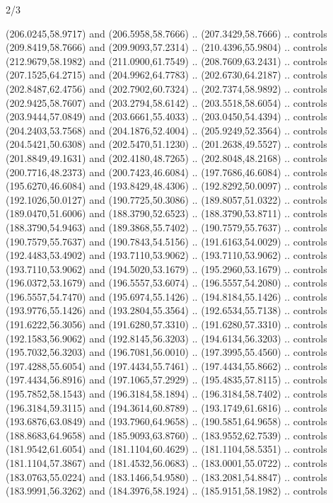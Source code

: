 \begin{flagdescription}{2/3}
\begin{scope}[xshift=0.5\flaglength,yshift=0.5\flagwidth,scale=\flagwidth/180]
\begin{scope}[y=0.8pt, x=0.8pt, yscale=-1,shift={(-168.75,-108.75)}]
  (206.0245,58.9717) and (206.5958,58.7666) .. (207.3429,58.7666) .. controls
  (209.8419,58.7666) and (209.9093,57.2314) .. (210.4396,55.9804) .. controls
  (212.9679,58.1982) and (211.0900,61.7549) .. (208.7609,63.2431) .. controls
  (207.1525,64.2715) and (204.9962,64.7783) .. (202.6730,64.2187) .. controls
  (202.8487,62.4756) and (202.7902,60.7324) .. (202.7374,58.9892) .. controls
  (202.9425,58.7607) and (203.2794,58.6142) .. (203.5518,58.6054) .. controls
  (203.9444,57.0849) and (203.6661,55.4033) .. (203.0450,54.4394) .. controls
  (204.2403,53.7568) and (204.1876,52.4004) .. (205.9249,52.3564) .. controls
  (204.5421,50.6308) and (202.5470,51.1230) .. (201.2638,49.5527) .. controls
  (201.8849,49.1631) and (202.4180,48.7265) .. (202.8048,48.2168) .. controls
  (200.7716,48.2373) and (200.7423,46.6084) .. (197.7686,46.6084) .. controls
  (195.6270,46.6084) and (193.8429,48.4306) .. (192.8292,50.0097) .. controls
  (192.1026,50.0127) and (190.7725,50.3086) .. (189.8057,51.0322) .. controls
  (189.0470,51.6006) and (188.3790,52.6523) .. (188.3790,53.8711) .. controls
  (188.3790,54.9463) and (189.3868,55.7402) .. (190.7579,55.7637) .. controls
  (190.7579,55.7637) and (190.7843,54.5156) .. (191.6163,54.0029) .. controls
  (192.4483,53.4902) and (193.7110,53.9062) .. (193.7110,53.9062) .. controls
  (193.7110,53.9062) and (194.5020,53.1679) .. (195.2960,53.1679) .. controls
  (196.0372,53.1679) and (196.5557,53.6074) .. (196.5557,54.2080) .. controls
  (196.5557,54.7470) and (195.6974,55.1426) .. (194.8184,55.1426) .. controls
  (193.9776,55.1426) and (193.2804,55.3564) .. (192.6534,55.7138) .. controls
  (191.6222,56.3056) and (191.6280,57.3310) .. (191.6280,57.3310) .. controls
  (192.1583,56.9062) and (192.8145,56.3203) .. (194.6134,56.3203) .. controls
  (195.7032,56.3203) and (196.7081,56.0010) .. (197.3995,55.4560) .. controls
  (197.4288,55.6054) and (197.4434,55.7461) .. (197.4434,55.8662) .. controls
  (197.4434,56.8916) and (197.1065,57.2929) .. (195.4835,57.8115) .. controls
  (195.7852,58.1543) and (196.3184,58.1894) .. (196.3184,58.7402) .. controls
  (196.3184,59.3115) and (194.3614,60.8789) .. (193.1749,61.6816) .. controls
  (193.6876,63.0849) and (193.7960,64.9658) .. (190.5851,64.9658) .. controls
  (188.8683,64.9658) and (185.9093,63.8760) .. (183.9552,62.7539) .. controls
  (181.9542,61.6054) and (181.1104,60.4629) .. (181.1104,58.5351) .. controls
  (181.1104,57.3867) and (181.4532,56.0683) .. (183.0001,55.0722) .. controls
  (183.0763,55.0224) and (183.1466,54.9580) .. (183.2081,54.8847) .. controls
  (183.9991,56.3262) and (184.3976,58.1924) .. (185.9151,58.1982) .. controls

\end{scope}
\end{scope}
\end{flagdescription}

